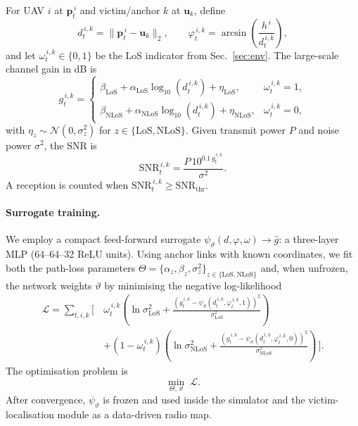 \documentclass[drones,article,accept,pdftex,moreauthors]{Definitions/mdpi}
\begin{document}
For UAV $i$ at $\mathbf{p}_t^{\,i}$ and victim/anchor $k$ at $\mathbf{u}_k$, define
\begin{equation}
d_t^{\,i,k} = \big\|\mathbf{p}_t^{\,i} - \mathbf{u}_k\big\|_2, 
\qquad
\varphi_t^{\,i,k} = \arcsin\!\left(\frac{h^{\,i}}{d_t^{\,i,k}}\right),
\label{eq:dist_elev}
\end{equation}
and let $\omega_t^{\,i,k}\in\{0,1\}$ be the LoS indicator from Sec.~\ref{sec:env}. The
large-scale channel gain in dB is
\begin{equation}
g_t^{\,i,k} =
\begin{cases}
\beta_{\mathrm{LoS}} + \alpha_{\mathrm{LoS}}\log_{10}(d_t^{\,i,k}) + \eta_{\mathrm{LoS}}, & \omega_t^{\,i,k}=1,\\[4pt]
\beta_{\mathrm{NLoS}} + \alpha_{\mathrm{NLoS}}\log_{10}(d_t^{\,i,k}) + \eta_{\mathrm{NLoS}}, & \omega_t^{\,i,k}=0,
\end{cases}
\label{eq:gain}
\end{equation}
with $\eta_z\sim\mathcal{N}(0,\sigma_z^2)$ for $z\in\{\mathrm{LoS},\mathrm{NLoS}\}$. Given
transmit power $P$ and noise power $\sigma^2$, the SNR is
\begin{equation}
\mathrm{SNR}_t^{\,i,k} = \frac{P\,10^{0.1\,g_t^{\,i,k}}}{\sigma^2}.
\label{eq:SNR}
\end{equation}
A reception is counted when $\mathrm{SNR}_t^{\,i,k}\ge \mathrm{SNR}_{\mathrm{thr}}$.

\paragraph{Surrogate training.}
We employ a compact feed-forward surrogate $\psi_{\vartheta}(d,\varphi,\omega)\!\rightarrow\!\hat g$:
a three-layer MLP (64–64–32 ReLU units). Using anchor links with known coordinates,
we fit both the path-loss parameters
$\Theta=\{\alpha_z,\beta_z,\sigma_z^2\}_{z\in\{\mathrm{LoS},\mathrm{NLoS}\}}$ and, when
unfrozen, the network weights $\vartheta$ by minimising the negative log-likelihood
\begin{equation}
\begin{split}
\mathcal{L} = \sum_{t,i,k} \Big[\, & 
\omega_t^{\,i,k} \left( 
\ln \sigma_{\mathrm{LoS}}^{2}
+ \frac{(g_t^{\,i,k}-\psi_{\vartheta}(d_t^{\,i,k},\varphi_t^{\,i,k},1))^{2}}{\sigma_{\mathrm{LoS}}^{2}} 
\right) \\
& + (1-\omega_t^{\,i,k}) \left( 
\ln \sigma_{\mathrm{NLoS}}^{2}
+ \frac{(g_t^{\,i,k}-\psi_{\vartheta}(d_t^{\,i,k},\varphi_t^{\,i,k},0))^{2}}{\sigma_{\mathrm{NLoS}}^{2}} 
\right) \,\Big].
\end{split}
\label{eq:nll}
\end{equation}
The optimisation problem is
\begin{equation}
\min_{\Theta,\,\vartheta}\; \mathcal{L}.
\label{eq:chan_opt}
\end{equation}
After convergence, $\psi_{\vartheta}$ is frozen and used inside the simulator and the
victim-localisation module as a data-driven radio map.
\end{document}

